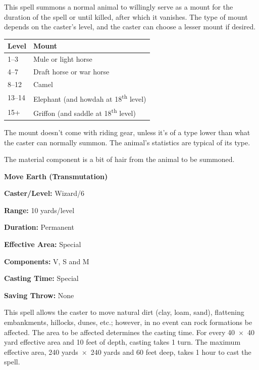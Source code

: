 \begin{multicols}{2}
\begin{minipage}{\columnwidth}
\end{minipage}

This spell summons a normal animal to willingly serve as a mount for the duration of the spell or until killed, after which it vanishes.  The type of mount depends on the caster's level, and the caster can choose a lesser mount if desired.
 
\noindent
\begin{tabular}{|p{}|p{}|}
\hline
Level	& Mount \\
\hline\hline
\rowcolor[gray]{.9}1--3	& Mule or light horse \\
4--7	& Draft horse or war horse \\
\rowcolor[gray]{.9}8--12	& Camel \\
13--14	& Elephant (and howdah at 18\textsuperscript{th} level) \\
\rowcolor[gray]{.9}15+	& Griffon (and saddle at 18\textsuperscript{th} level) \\
\hline
\end{tabular}

The mount doesn't come with riding gear, unless it's of a type lower than what the caster can normally summon.  The animal's statistics are typical of its type.

The material component is a bit of hair from the animal to be summoned.

\vspace{1em}

\noindent
\begin{minipage}{\columnwidth}

\noindent \textbf{Move Earth (Transmutation)}

\noindent \textbf{Caster/Level:} Wizard/6

\noindent \textbf{Range:} 10 yards/level

\noindent \textbf{Duration:} Permanent

\noindent \textbf{Effective Area:} Special

\noindent \textbf{Components:} V, S and M

\noindent \textbf{Casting Time:} Special

\noindent \textbf{Saving Throw:} None

\end{minipage}

This spell allows the caster to move natural dirt (clay, loam, sand), flattening embankments, hillocks, dunes, etc.; however, in no event can rock formations be affected.  The area to be affected determines the casting time.  For every 40~$\times$~40 yard effective area and 10 feet of depth, casting takes 1 turn.  The maximum effective area, 240 yards~$\times$~240 yards and 60 feet deep, takes 1 hour to cast the spell. 


\end{multicols}
